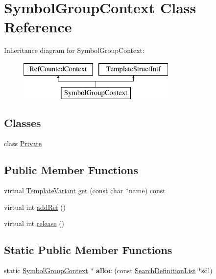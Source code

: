 \hypertarget{class_symbol_group_context}{}\section{Symbol\+Group\+Context Class Reference}
\label{class_symbol_group_context}
Inheritance diagram for Symbol\+Group\+Context\+:\begin{figure}[H]
\begin{center}
\leavevmode
\includegraphics[height=2.000000cm]{class_symbol_group_context}
\end{center}
\end{figure}
\subsection*{Classes}
\begin{DoxyCompactItemize}
\item 
class \mbox{\hyperlink{class_symbol_group_context_1_1_private}{Private}}
\end{DoxyCompactItemize}
\subsection*{Public Member Functions}
\begin{DoxyCompactItemize}
\item 
virtual \mbox{\hyperlink{class_template_variant}{Template\+Variant}} \mbox{\hyperlink{class_symbol_group_context_a6d49b23c9e9aff55dcd9afe3e0b951b4}{get}} (const char $\ast$name) const
\item 
virtual int \mbox{\hyperlink{class_symbol_group_context_a8de19cf7aa3c966d418228af3cf487dc}{add\+Ref}} ()
\item 
virtual int \mbox{\hyperlink{class_symbol_group_context_aa5fd71b51aed2de864d296319b88b114}{release}} ()
\end{DoxyCompactItemize}
\subsection*{Static Public Member Functions}
\begin{DoxyCompactItemize}
\item 
\mbox{\label{class_symbol_group_context_a4502e58d7acebf342a7933ccb444f3ad}} 
static \mbox{\hyperlink{class_symbol_group_context}{Symbol\+Group\+Context}} $\ast$ {\bfseries alloc} (const \mbox{\hyperlink{class_search_definition_list}{Search\+Definition\+List}} $\ast$sdl)
\end{DoxyCompactItemize}


